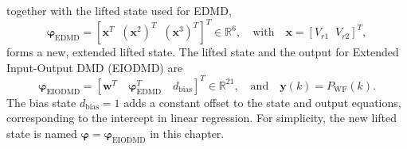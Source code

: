 together with the lifted state used for EDMD,
\begin{equation}
    \bm{\varphi}_{\text{EDMD}} = [\bm{x}^T \;\; (\bm{x}^2)^T \;\; (\bm{x}^3)^T]^T \in \mathbb{R}^{6}, \quad \text{with} \quad \bm{x} = [V_{r1} \;\; V_{r2}]^T,
\end{equation}
forms a new, extended lifted state. The lifted state and the output for Extended Input-Output DMD (EIODMD) are
%
\begin{equation}
    \bm{\varphi}_{\text{EIODMD}}= [\bm{w}^T \quad  \bm{\varphi}_{\text{EDMD}}^T \quad d_{\text{bias}}]^T \in \mathbb{R}^{21}, \quad \text{and} \quad \bm{y}(k) = P_{\text{WF}}(k).
\end{equation}
%
The bias state $d_{\text{bias}} = 1$ adds a constant offset to the state and output equations, corresponding to the intercept in linear regression. For simplicity, the new lifted state is named $\bm{\varphi} = \bm{\varphi}_{\text{EIODMD}}$ in this chapter.

